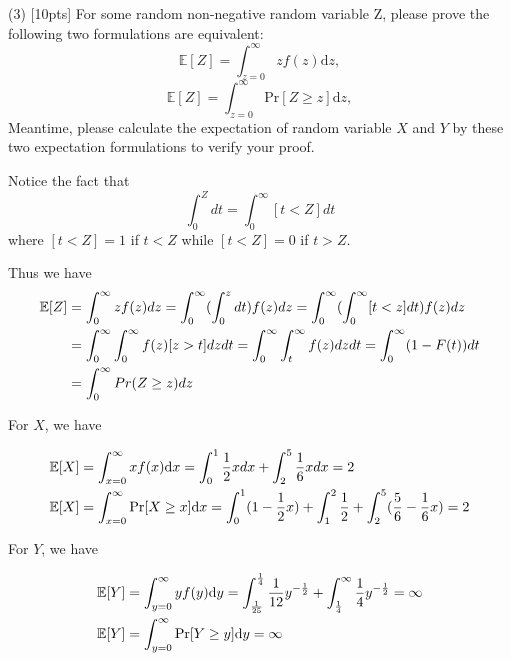 	(3) [10pts] For some random non-negative random variable Z, please prove the following two formulations are equivalent:\\
	\begin{equation}
	\mathbb{E}[Z]=\int^\infty_{z=0} z f(z)\mathrm{d}z,
	\end{equation}
	\begin{equation}
	\mathbb{E}[Z]=\int^\infty_{z=0} \mathrm{Pr}[Z\geq z]\mathrm{d}z,
	\end{equation}
	Meantime, please calculate the expectation of random variable $X$ and $Y$ by these two expectation formulations to verify your proof.

	\begin{solution}
		Notice the fact that
		\[\int_0^Z dt=\int_0^\infty [t<Z]dt\]
		where $[t<Z]=1$ if $t<Z$ while $[t<Z]=0$ if $t>Z$.

		Thus we have
		\begin{align}
			\mathbb{E}[Z] & =\int_0^\infty zf(z)dz = \int_0^\infty (\int_0^z dt)f(z)dz = \int_0^\infty(\int_0^\infty [t<z]dt)f(z) dz\notag\\
			& = \int_0^\infty\int_0^\infty f(z)[z>t] dzdt =\int_0^\infty\int_t^\infty f(z) dzdt = \int_0^\infty (1-F(t))dt\notag\\
			& = \int_0^\infty Pr(Z\geq z)dz\notag
		\end{align}

		For $X$, we have

		\begin{align}
			\mathbb{E}[X] & =\int^\infty_{x=0} x f(x)\mathrm{d}x = \int_0^1 \frac{1}{2}x dx + \int_2^5 \frac{1}{6}x dx = 2\notag\\
			\mathbb{E}[X] & =\int^\infty_{x=0} \mathrm{Pr}[X\geq x]\mathrm{d}x = \int_0^1(1-\frac{1}{2}x)+\int_1^2\frac{1}{2}+\int_2^5(\frac{5}{6}-\frac{1}{6}x) = 2\notag
		\end{align}

		For $Y$, we have

		\begin{align}
			\mathbb{E}[Y] & =\int^\infty_{y=0} y f(y)\mathrm{d}y = \int_{\frac{1}{25}}^{\frac{1}{4}} \frac{1}{12}y^{-\frac{1}{2}} + \int_\frac{1}{4}^\infty \frac{1}{4}y^{-\frac{1}{2}} = \infty\notag\\
			\mathbb{E}[Y] & =\int^\infty_{y=0} \mathrm{Pr}[Y\geq y]\mathrm{d}y = \infty\notag
		\end{align}

	\end{solution}

